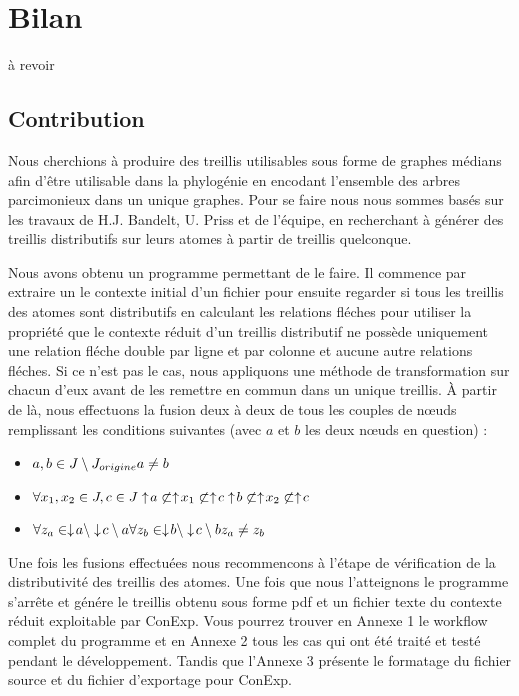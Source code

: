 \chapter{Bilan}

à revoir

\section{Contribution}

Nous cherchions à produire des treillis utilisables sous forme de graphes médians afin d'être utilisable dans la phylogénie en encodant l'ensemble des arbres parcimonieux dans un unique graphes. Pour se faire nous nous sommes basés sur les travaux de H.J. Bandelt, U. Priss et de l'équipe, en recherchant à générer des treillis distributifs sur leurs atomes à partir de treillis quelconque.

\smallbreak

Nous avons obtenu un programme permettant de le faire. Il commence par extraire un le contexte initial d'un fichier pour ensuite regarder si tous les treillis des atomes sont distributifs en calculant les relations fléches pour utiliser la propriété que le contexte réduit d'un treillis distributif ne possède uniquement une relation fléche double par ligne et par colonne et aucune autre relations fléches. Si ce n'est pas le cas, nous appliquons une méthode de transformation sur chacun d'eux avant de les remettre en commun dans un unique treillis. À partir de là, nous effectuons la fusion deux à deux de tous les couples de n\oe uds remplissant les conditions suivantes (avec $a$ et $b$ les deux n\oe uds en question) :
\begin{itemize}
	\item $a, b \in J \setminus J_{origine}\\
		a \neq b$
	\item $\forall x_1, x_2 \in J, c \in J\\
		\uparrow \! a \not \subset \uparrow \! x_1 \not \subset \uparrow \! c\\
		\uparrow \! b \not \subset \uparrow \! x_2 \not \subset \uparrow \! c$
	\item $\forall z_a \in \downarrow \! a \setminus \downarrow \! c \setminus a\\
		\forall z_b \in \downarrow \! b \setminus \downarrow \! c \setminus b\\
		z_a \neq z_b$
\end{itemize}
Une fois les fusions effectuées nous recommencons à l'étape de vérification de la distributivité des treillis des atomes. Une fois que nous l'atteignons le programme s'arrête et génére le treillis obtenu sous forme pdf et un fichier texte du contexte réduit exploitable par ConExp. Vous pourrez trouver en Annexe 1 le workflow complet du programme et en Annexe 2 tous les cas qui ont été traité et testé pendant le développement. Tandis que l'Annexe 3 présente le formatage du fichier source et du fichier d'exportage pour ConExp.

